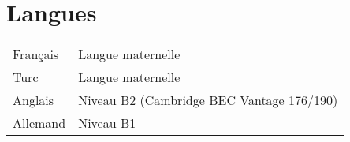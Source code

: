 \documentclass[a4paper,11pt]{article}
\begin{document}
\section{Langues}
\begin{tabularx}{\linewidth}{@{}l X@{}}
Français &  \normalsize{Langue maternelle}\\
Turc     &  \normalsize{Langue maternelle}\\
Anglais  &  \normalsize{Niveau B2 (Cambridge BEC Vantage 176/190)}\\
Allemand &  \normalsize{Niveau B1}\\
\end{tabularx}

\end{document}
